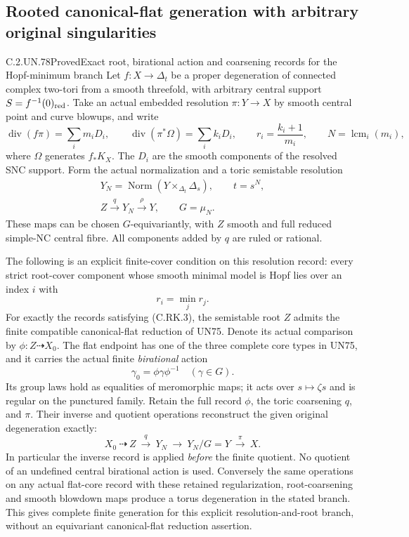 \subsection{Rooted canonical-flat generation with arbitrary original singularities}

\begin{statement}{C.2.UN.78}{Proved}{Exact root, birational action and coarsening records for the Hopf-minimum branch}
Let $f:X\to\Delta_t$ be a proper degeneration of connected
complex two-tori from a smooth threefold, with arbitrary
central support $S=f^{-1}(0)_{\rm red}$. Take an actual
embedded resolution $\pi:Y\to X$ by smooth central
point and curve blowups, and write
\[
 \operatorname{div}(f\pi)=\sum_i m_iD_i,
 \qquad \operatorname{div}(\pi^*\Omega)=\sum_i k_iD_i,
 \qquad r_i=\frac{k_i+1}{m_i},
 \qquad N=\operatorname{lcm}_i(m_i),
\tag{C.RK.1}
\]
where $\Omega$ generates $f_*K_X$. The $D_i$ are the
smooth components of the resolved SNC support. Form
the actual normalization and a toric semistable
resolution
\[
 \begin{gathered}
 Y_N=\operatorname{Norm}(Y\times_{\Delta_t}\Delta_s),
                \qquad t=s^N,\\
 Z\xrightarrow{\ q\ }Y_N\xrightarrow{\ \rho\ }Y,
                 \qquad G=\mu_N.
 \end{gathered}
\tag{C.RK.2}
\]
These maps can be chosen $G$-equivariantly, with $Z$
smooth and full reduced simple-NC central fibre.
All components added by $q$ are ruled or rational.

The following is an explicit finite-cover condition
on this resolution record: every strict root-cover
component whose smooth minimal model is Hopf lies
over an index $i$ with
\[
                            r_i=\min_j r_j.
\tag{C.RK.3}
\]
For exactly the records satisfying (C.RK.3), the
semistable root $Z$ admits the finite compatible
canonical-flat reduction of UN75. Denote its
actual comparison by $\phi:Z\dashrightarrow X_0$.
The flat endpoint has one of the three complete
core types in UN75, and it carries the actual
finite \emph{birational} action
\[
                 \gamma_0=\phi\gamma\phi^{-1}
                 \quad (\gamma\in G).
\tag{C.RK.4}
\]
Its group laws hold as equalities of meromorphic
maps; it acts over $s\mapsto\zeta s$ and is regular
on the punctured family. Retain the full record
$\phi$, the toric coarsening $q$, and $\pi$.
Their inverse and quotient operations reconstruct
the given original degeneration exactly:
\[
 X_0\ \dashrightarrow\ Z\ \xrightarrow{q}\ Y_N
       \ \longrightarrow\ Y_N/G=Y
       \ \xrightarrow{\pi}\ X.
\tag{C.RK.5}
\]
In particular the inverse record is applied
\emph{before} the finite quotient. No quotient of
an undefined central birational action is used.
Conversely the same operations on any actual
flat-core record with these retained regularization,
root-coarsening and smooth blowdown maps produce
a torus degeneration in the stated branch.
This gives complete finite generation for this
explicit resolution-and-root branch, without
an equivariant canonical-flat reduction assertion.


\end{statement}
